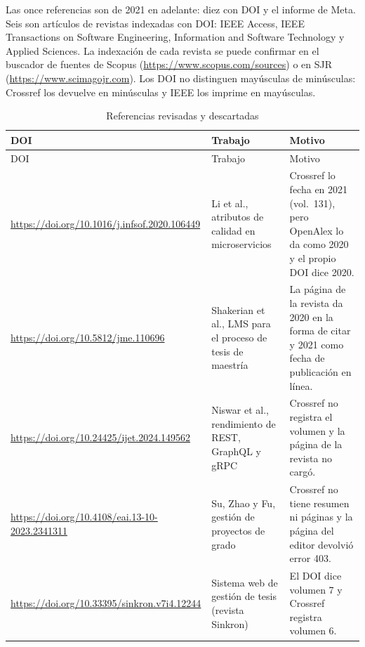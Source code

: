 Las once referencias son de 2021 en adelante: diez con DOI y el informe de Meta. Seis son artículos de revistas indexadas con DOI: IEEE Access, IEEE Transactions on Software Engineering, Information and Software Technology y Applied Sciences. La indexación de cada revista se puede confirmar en el buscador de fuentes de Scopus (\url{https://www.scopus.com/sources}) o en SJR (\url{https://www.scimagojr.com}). Los DOI no distinguen mayúsculas de minúsculas: Crossref los devuelve en minúsculas y IEEE los imprime en mayúsculas.

\begingroup
\footnotesize
\setlength{\tabcolsep}{3pt}
\begin{longtable}{@{}L{4.4cm}L{4.4cm}L{6.4cm}@{}}
\caption{Referencias revisadas y descartadas}\label{tab:descartadas}\\
\toprule
DOI & Trabajo & Motivo \\
\midrule
\endfirsthead
\toprule
DOI & Trabajo & Motivo \\
\midrule
\endhead
\bottomrule
\endfoot
\url{https://doi.org/10.1016/j.infsof.2020.106449} & Li et al., atributos de calidad en microservicios & Crossref lo fecha en 2021 (vol.~131), pero OpenAlex lo da como 2020 y el propio DOI dice 2020. \\
\url{https://doi.org/10.5812/jme.110696} & Shakerian et al., LMS para el proceso de tesis de maestría & La página de la revista da 2020 en la forma de citar y 2021 como fecha de publicación en línea. \\
\url{https://doi.org/10.24425/ijet.2024.149562} & Niswar et al., rendimiento de REST, GraphQL y gRPC & Crossref no registra el volumen y la página de la revista no cargó. \\
\url{https://doi.org/10.4108/eai.13-10-2023.2341311} & Su, Zhao y Fu, gestión de proyectos de grado & Crossref no tiene resumen ni páginas y la página del editor devolvió error 403. \\
\url{https://doi.org/10.33395/sinkron.v7i4.12244} & Sistema web de gestión de tesis (revista Sinkron) & El DOI dice volumen 7 y Crossref registra volumen 6. \\
\end{longtable}
\endgroup
